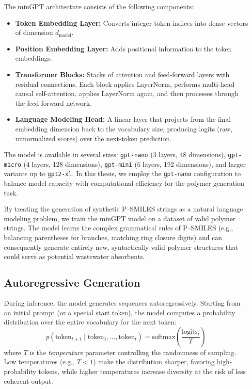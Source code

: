 The minGPT architecture consists of the following components:
\begin{itemize}
	\item \textbf{Token Embedding Layer:} Converts integer token indices into dense vectors of dimension $d_{\text{model}}$.
	\item \textbf{Position Embedding Layer:} Adds positional information to the token embeddings.
	\item \textbf{Transformer Blocks:} Stacks of attention and feed-forward layers with residual connections. Each block applies LayerNorm, performs multi-head causal self-attention, applies LayerNorm again, and then processes through the feed-forward network.
	\item \textbf{Language Modeling Head:} A linear layer that projects from the final embedding dimension back to the vocabulary size, producing logits (raw, unnormalized scores) over the next-token prediction.
\end{itemize}

The model is available in several sizes: \texttt{gpt-nano} (3 layers, 48 dimensions), \texttt{gpt-micro} (4 layers, 128 dimensions), \texttt{gpt-mini} (6 layers, 192 dimensions), and larger variants up to \texttt{gpt2-xl}. In this thesis, we employ the \texttt{gpt-nano} configuration to balance model capacity with computational efficiency for the polymer generation task.

By treating the generation of synthetic P--SMILES strings as a natural language modeling problem, we train the minGPT model on a dataset of valid polymer strings. The model learns the complex grammatical rules of P--SMILES (e.g., balancing parentheses for branches, matching ring closure digits) and can consequently generate entirely new, syntactically valid polymer structures that could serve as potential wastewater absorbents.

\subsection{Autoregressive Generation}
\label{sec:autoregressive_generation}

During inference, the model generates sequences autoregressively. Starting from an initial prompt (or a special start token), the model computes a probability distribution over the entire vocabulary for the next token:
\begin{equation}
	p(\text{token}_{t+1} \mid \text{token}_1, \ldots, \text{token}_t) = \text{softmax}\left(\frac{\text{logits}_t}{T}\right)
\end{equation}
where $T$ is the \emph{temperature} parameter controlling the randomness of sampling. Low temperatures (e.g., $T < 1$) make the distribution sharper, favoring high-probability tokens, while higher temperatures increase diversity at the risk of less coherent output.

